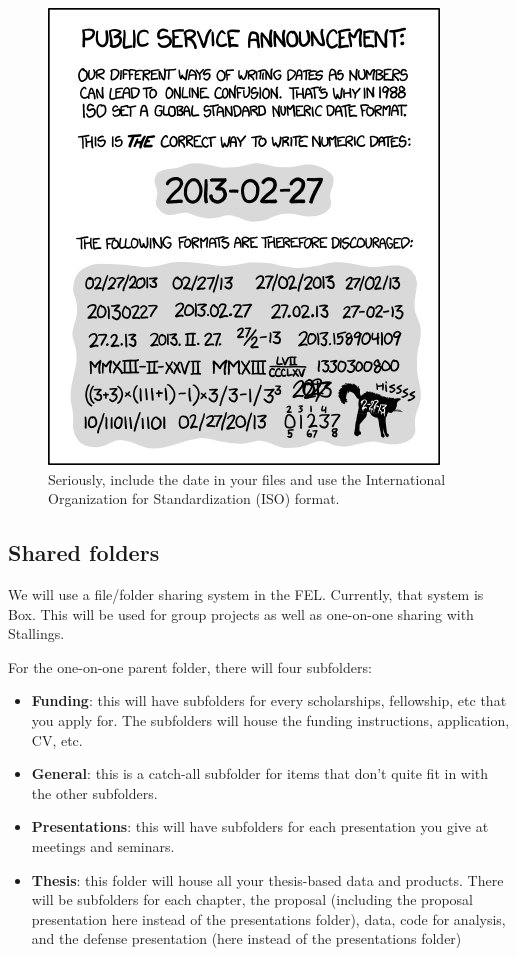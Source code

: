 \documentclass[
]{article}
\providecommand{\tightlist}{%
  \setlength{\itemsep}{0pt}\setlength{\parskip}{0pt}}
\begin{document}
\begin{figure}

{\centering \includegraphics[width=0.75\linewidth]{Images/FileDating_YYYY_MM_DD} 

}

\caption{Seriously, include the date in your files and use the International Organization for Standardization (ISO) format.}\label{fig:unnamed-chunk-1}
\end{figure}

\hypertarget{shared-folders}{%
\subsection{Shared folders}\label{shared-folders}}

We will use a file/folder sharing system in the FEL. Currently, that system is Box. This will be used for group projects as well as one-on-one sharing with Stallings.

For the one-on-one parent folder, there will four subfolders:

\begin{itemize}
\tightlist
\item
  \textbf{Funding}: this will have subfolders for every scholarships, fellowship, etc that you apply for. The subfolders will house the funding instructions, application, CV, etc.
\item
  \textbf{General}: this is a catch-all subfolder for items that don't quite fit in with the other subfolders.
\item
  \textbf{Presentations}: this will have subfolders for each presentation you give at meetings and seminars.
\item
  \textbf{Thesis}: this folder will house all your thesis-based data and products. There will be subfolders for each chapter, the proposal (including the proposal presentation here instead of the presentations folder), data, code for analysis, and the defense presentation (here instead of the presentations folder)
\end{itemize}
\end{document}
